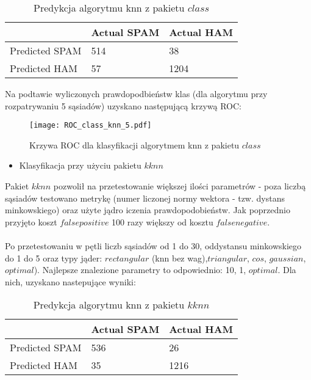 \documentclass[fleqn]{article}
\begin{document}
\begin{table}[h!]
  \centering
  \label{tab:table1}
  \begin{tabular}{l||l|l}
     & Actual SPAM & Actual HAM\\
    \hline
    Predicted SPAM & 514 & 38\\
    Predicted HAM & 57 & 1204\\
  \end{tabular}
  \caption{Predykcja algorytmu knn z pakietu $class$}
\end{table}

\noindent Na podtawie wyliczonych prawdopodbieństw klas (dla algorytmu przy rozpatrywaniu 5 sąsiadów) uzyskano następującą krzywą ROC:

\begin{figure}[H]
\centering
\texttt{[image: ROC\_class\_knn\_5.pdf]}
\caption{Krzywa ROC dla klasyfikacji algorytmem knn z pakietu $class$ \label{overflow}}
\label{fig:picture}
\end{figure}

\begin{itemize}
    \item Klasyfikacja przy użyciu pakietu $kknn$ 
\end{itemize}

Pakiet $kknn$ pozwolił na przetestowanie większej ilości parametrów - poza liczbą sąsiadów testowano metrykę (numer liczonej normy wektora - tzw. dystans minkowskiego) oraz użyte jądro iczenia prawdopodobieństw. Jak poprzednio przyjęto koszt $false positive$ 100 razy większy od kosztu $false negative$.
\\ \\
\noindent Po przetestowaniu w pętli liczb sąsiadów od 1 do 30, oddystansu minkowskiego do 1 do 5 oraz typy jąder: $rectangular$ (knn bez wag),$triangular$, $cos$, $gaussian$, $optimal$). Najlepsze znalezione parametry to odpowiednio: 10, 1, $optimal$. Dla nich, uzyskano nastepujące wyniki:

\begin{table}[h!]
  \centering
  \label{tab:table1}
  \begin{tabular}{l||l|l}
     & Actual SPAM & Actual HAM\\
    \hline
    Predicted SPAM & 536 & 26\\
    Predicted HAM & 35 & 1216\\
  \end{tabular}
  \caption{Predykcja algorytmu knn z pakietu $kknn$}
\end{table}
\end{document}
